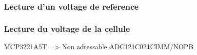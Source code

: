 \documentclass[12pt,letterpaper]{article}
\begin{document}
\begin{normalsize}
				\subsubsection{Lecture d'un voltage de reference}
					
				
				\subsubsection{Lecture du voltage de la cellule}
					MCP3221A5T => Non adressable
					ADC121C021CIMM/NOPB
				
	\end{normalsize}
\end{document}
